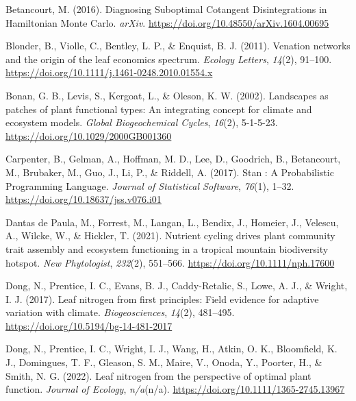 \documentclass[
  12pt,
  letterpaper,
  DIV=11,
  numbers=noendperiod]{scrartcl}
\newlength{\cslhangindent}
\newlength{\cslentryspacingunit} %
\newenvironment{CSLReferences}[2] %
 {%
  \setlength{\parindent}{0pt}
  \ifodd #1
  \let\oldpar\par
  \def\par{\hangindent=\cslhangindent\oldpar}
  \fi
  \setlength{\parskip}{#2\cslentryspacingunit}
 }%
 {}
\begin{document}
\hypertarget{refs}{}
\begin{CSLReferences}{1}{0}
\leavevmode{}%
Betancourt, M. (2016). Diagnosing {Suboptimal Cotangent Disintegrations}
in {Hamiltonian Monte Carlo}. \emph{arXiv}.
\url{https://doi.org/10.48550/arXiv.1604.00695}

\leavevmode{}%
Blonder, B., Violle, C., Bentley, L. P., \& Enquist, B. J. (2011).
Venation networks and the origin of the leaf economics spectrum.
\emph{Ecology Letters}, \emph{14}(2), 91--100.
\url{https://doi.org/10.1111/j.1461-0248.2010.01554.x}

\leavevmode{}%
Bonan, G. B., Levis, S., Kergoat, L., \& Oleson, K. W. (2002).
Landscapes as patches of plant functional types: {An} integrating
concept for climate and ecosystem models. \emph{Global Biogeochemical
Cycles}, \emph{16}(2), 5-1-5-23.
\url{https://doi.org/10.1029/2000GB001360}

\leavevmode{}%
Carpenter, B., Gelman, A., Hoffman, M. D., Lee, D., Goodrich, B.,
Betancourt, M., Brubaker, M., Guo, J., Li, P., \& Riddell, A. (2017).
Stan : {A Probabilistic Programming Language}. \emph{Journal of
Statistical Software}, \emph{76}(1), 1--32.
\url{https://doi.org/10.18637/jss.v076.i01}

\leavevmode{}%
Dantas de Paula, M., Forrest, M., Langan, L., Bendix, J., Homeier, J.,
Velescu, A., Wilcke, W., \& Hickler, T. (2021). Nutrient cycling drives
plant community trait assembly and ecosystem functioning in a tropical
mountain biodiversity hotspot. \emph{New Phytologist}, \emph{232}(2),
551--566. \url{https://doi.org/10.1111/nph.17600}

\leavevmode{}%
Dong, N., Prentice, I. C., Evans, B. J., Caddy-Retalic, S., Lowe, A. J.,
\& Wright, I. J. (2017). Leaf nitrogen from first principles: Field
evidence for adaptive variation with climate. \emph{Biogeosciences},
\emph{14}(2), 481--495. \url{https://doi.org/10.5194/bg-14-481-2017}

\leavevmode{}%
Dong, N., Prentice, I. C., Wright, I. J., Wang, H., Atkin, O. K.,
Bloomfield, K. J., Domingues, T. F., Gleason, S. M., Maire, V., Onoda,
Y., Poorter, H., \& Smith, N. G. (2022). Leaf nitrogen from the
perspective of optimal plant function. \emph{Journal of Ecology},
\emph{n/a}(n/a). \url{https://doi.org/10.1111/1365-2745.13967}


\end{CSLReferences}
\end{document}
